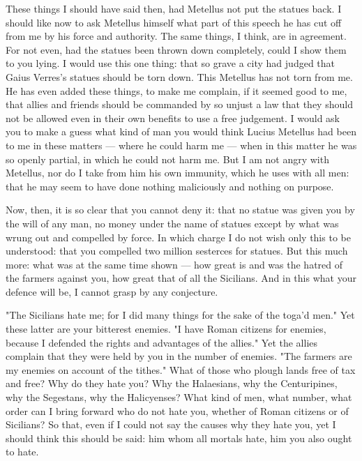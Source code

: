  These things I should have said then, had Metellus not put the statues back. I should like now to ask Metellus himself what part of this speech he has cut off from me by his force and authority. The same things, I think, are in agreement. For not even, had the statues been thrown down completely, could I show them to you lying. I would use this one thing: that so grave a city had judged that Gaius Verres's statues should be torn down. This Metellus has not torn from me. He has even added these things, to make me complain, if it seemed good to me, that allies and friends should be commanded by so unjust a law that they should not be allowed even in their own benefits to use a free judgement. I would ask you to make a guess what kind of man you would think Lucius Metellus had been to me in these matters --- where he could harm me --- when in this matter he was so openly partial, in which he could not harm me. But I am not angry with Metellus, nor do I take from him his own immunity, which he uses with all men: that he may seem to have done nothing maliciously and nothing on purpose.

 Now, then, it is so clear that you cannot deny it: that no statue was given you by the will of any man, no money under the name of statues except by what was wrung out and compelled by force. In which charge I do not wish only this to be understood: that you compelled two million sesterces for statues. But this much more: what was at the same time shown --- how great is and was the hatred of the farmers against you, how great that of all the Sicilians. And in this what your defence will be, I cannot grasp by any conjecture.

 "The Sicilians hate me; for I did many things for the sake of the toga'd men." Yet these latter are your bitterest enemies. "I have Roman citizens for enemies, because I defended the rights and advantages of the allies." Yet the allies complain that they were held by you in the number of enemies. "The farmers are my enemies on account of the tithes." What of those who plough lands free of tax and free? Why do they hate you? Why the Halaesians, why the Centuripines, why the Segestans, why the Halicyenses? What kind of men, what number, what order can I bring forward who do not hate you, whether of Roman citizens or of Sicilians? So that, even if I could not say the causes why they hate you, yet I should think this should be said: him whom all mortals hate, him you also ought to hate.

